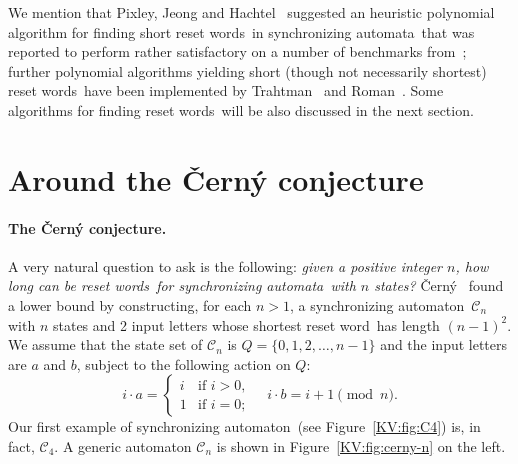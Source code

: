 \documentclass{irmaart}
\newcommand{\sa}{synchronizing au\-tom\-a\-ta}
\newcommand{\san}{synchronizing au\-tom\-a\-ton}
\newcommand{\sw}{reset word}
\newcommand{\sws}{reset words}
\theoremstyle{plain}
\begin{document}
We mention that Pixley, Jeong and Hachtel~\cite{Pixley&Jeong&Hachtel:1992}
suggested an heuristic polynomial algorithm for finding short \sws\ in \sa\
that was reported to perform rather satisfactory on a number of benchmarks
from~\cite{Yang:1991}; further polynomial algorithms yielding short (though not
necessarily shortest) \sws\ have been implemented by
Trahtman~\cite{Trahtman:2006} and Roman~\cite{Roman:2009,Roman:2009a}. Some
algorithms for finding \sws\ will be also discussed in the next section.

\section{Around the \v{C}ern\'{y} conjecture}
\label{KV:sec:Cerny conjecture}
\paragraph*{The \v{C}ern\'{y} conjecture.} A very natural question to ask
is the following: \emph{given a positive integer $n$, how long can be \sws\ for
\sa\ with $n$ states?} \v{C}ern\'{y}~\cite{Cerny:1964} found a lower bound by
constructing, for each $n>1$, a \san\
$\mathcal{C}_n$ with $n$ states and 2 input
letters whose shortest \sw\ has length $(n-1)^2$. We assume that the state set
of $\mathcal{C}_n$ is $Q=\{0,1,2,\dots,n-1\}$ and the input letters are $a$ and
$b$, subject to the following action on $Q$:
\begin{displaymath}
i\cdot a=\begin{cases}
i &\text{if } i>0,\\
1 &\text{if } i=0;
\end{cases}\quad
i\cdot b=i+1\!\!\pmod{n}.
\end{displaymath}
Our first example of \san\ (see Figure~\ref{KV:fig:C4}) is, in fact,
$\mathcal{C}_4$. A generic automaton $\mathcal{C}_n$ is shown in
Figure~\ref{KV:fig:cerny-n} on the left.
\end{document}
